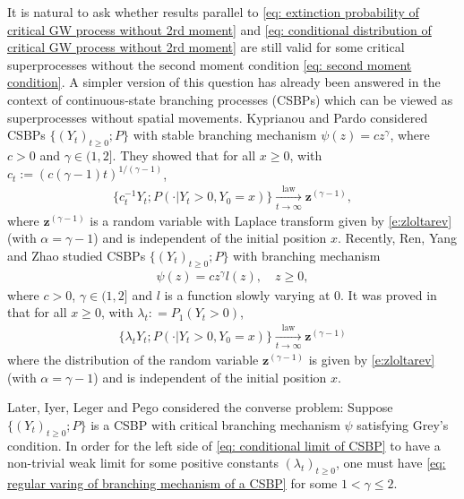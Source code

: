 \documentclass[12pt,a4paper]{amsart}
\theoremstyle{definition}
\numberwithin{equation}{section}
\begin{document}
It is natural to ask whether results parallel to \eqref{eq: extinction probability of critical GW process without 2rd moment} and \eqref{eq: conditional distribution of critical GW process without 2rd moment} are still valid for some critical superprocesses without the second moment condition \eqref{eq: second moment condition}.
A simpler version of this question has already been answered in the context of continuous-state branching processes	(CSBPs) which can be viewed as superprocesses without spatial movements.
Kyprianou and Pardo \cite{Kyprianou2008Continuous} considered CSBPs $\{(Y_t)_{t\geq 0}; P\}$ with stable branching mechanism $\psi(z) =c z^\gamma$, where $c > 0$ and $\gamma \in (1,2]$.
They showed that for all $x\geq 0$, with $c_t := (c(\gamma - 1)t)^{1/(\gamma - 1)}$,
\begin{align} \label{eq: conditional limit of CSBP with stable branching}
	\{c_t^{-1}Y_t; P( \cdot |Y_t > 0,Y_0 = x)\}
	\xrightarrow[t\to \infty]{\operatorname{law}} \mathbf z^{(\gamma - 1)},
\end{align}
where $\mathbf z^{(\gamma - 1)}$ is a random variable with Laplace transform given by \eqref{e:zloltarev} (with $\alpha=\gamma-1$) and is independent of the initial position $x$.
Recently, Ren, Yang and Zhao \cite{RenYangZhao2014Conditional} studied CSBPs $\{(Y_t)_{t\ge 0}; P\}$ with branching mechanism
\begin{align}\label{eq: regular varing of branching mechanism of a CSBP}
	\psi(z)
	= c z^\gamma l(z),
	\quad z\geq 0,
\end{align}
where $c > 0$, $\gamma \in (1,2]$ and $l$ is a function slowly varying  at $0$.
It was proved in  \cite{RenYangZhao2014Conditional} that for all $x\geq 0$, with $\lambda_t: = P_1(Y_t > 0)$,
\begin{align}\label{eq: conditional limit of CSBP}
	\{ \lambda_t Y_t ; P(\cdot | Y_t > 0, Y_0 = x)\}
  \xrightarrow[t\to \infty]{\operatorname{law}} \mathbf z^{(\gamma - 1)}
\end{align}
where the distribution of the random variable $\mathbf z^{(\gamma - 1)}$ is given by \eqref{e:zloltarev} (with $\alpha=\gamma-1$) and is independent of the initial position $x$.

Later, Iyer, Leger and Pego \cite{IyerLegerPego2015Limit} considered the converse problem:
Suppose  $\{(Y_t)_{t\geq 0}; P\}$ is a CSBP
with critical branching mechanism $\psi$ satisfying Grey's condition.
In order for the left side of \eqref{eq: conditional limit of CSBP} to have a non-trivial weak limit for some positive constants $(\lambda_t)_{t\geq 0}$, one must have \eqref{eq: regular varing of branching mechanism of a CSBP} for some $1< \gamma \leq 2$.
	
\end{document}
